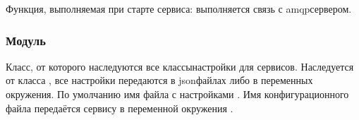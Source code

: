 \documentclass[a4paper,10pt,russian]{sphinxmanual}
\begin{document}
\begin{fulllineitems}
\begin{fulllineitems}
\end{fulllineitems}



\begin{fulllineitems}

\pysigstartsignatures
{}
\pysigstopsignatures
\sphinxAtStartPar
Функция, выполняемая при старте сервиса: выполняется связь с
amqp\sphinxhyphen{}сервером.

\end{fulllineitems}


\end{fulllineitems}



\subsubsection{Модуль }
\label{\detokenize{developer:svc-settings}}
\sphinxAtStartPar
Класс, от которого наследуются все классы\sphinxhyphen{}настройки для сервисов.
Наследуется от класса , все настройки передаются
в json\sphinxhyphen{}файлах либо в переменных окружения.
По умолчанию имя файла с настройками \sphinxhyphen{} .
Имя конфигурационного файла передаётся сервису в переменной окружения
.
\end{document}
